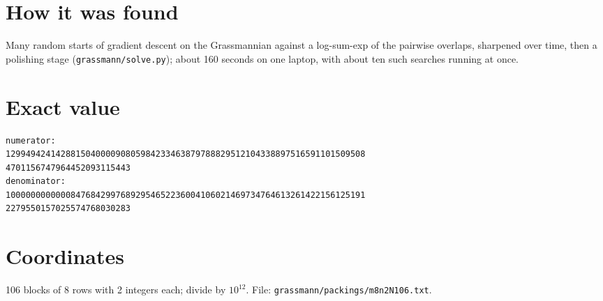 \documentclass[11pt,a4paper]{article}
\begin{document}
\section{How it was found}
Many random starts of gradient descent on the Grassmannian against a log-sum-exp of the pairwise overlaps, sharpened over time, then a polishing stage (\texttt{grassmann/solve.py}); about 160 seconds on one laptop, with about ten such searches running at once.


\appendix
\section{Exact value}
{\small
\begin{verbatim}
numerator:
129949424142881504000090805984233463879788829512104338897516591101509508
4701156747964452093115443
denominator:
100000000000084768429976892954652236004106021469734764613261422156125191
2279550157025574768030283
\end{verbatim}}

\section{Coordinates}
106 blocks of 8 rows with 2 integers each; divide by $10^{12}$. File: \texttt{grassmann/packings/m8n2N106.txt}.
{\tiny
\begin{multicols}{4}
\end{multicols}}
\end{document}

